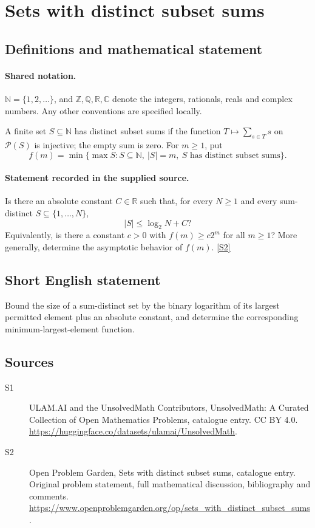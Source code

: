 \documentclass[11pt]{article}
\newcommand{\sref}[2]{\hyperlink{source:#1:#2}{[S#2]}}
\begin{document}
\section{Sets with distinct subset sums}\label{statement}

\subsection{Definitions and mathematical statement}

\paragraph{Shared notation.}$\mathbb N=\{1,2,\ldots\}$, and $\mathbb Z,\mathbb Q,\mathbb R,\mathbb C$ denote the integers, rationals, reals and complex numbers. Any other conventions are specified locally.


A finite set $S\subseteq\mathbb N$ has distinct subset sums if the function $T\mapsto\sum_{s\in T}s$ on $\mathcal P(S)$ is injective; the empty sum is zero. For $m\ge1$, put
\[
 f(m)=\min\{\max S:S\subseteq\mathbb N,\ |S|=m,\ S\text{ has distinct subset sums}\}.
\]
\paragraph{Statement recorded in the supplied source.}
Is there an absolute constant $C\in\mathbb R$ such that, for every $N\ge1$ and every sum-distinct $S\subseteq\{1,\ldots,N\}$,
\[
 |S|\le\log_2 N+C?
\]
Equivalently, is there a constant $c>0$ with $f(m)\ge c2^m$ for all $m\ge1$? More generally, determine the asymptotic behavior of $f(m)$. \sref{statement}{2}
\subsection{Short English statement}
Bound the size of a sum-distinct set by the binary logarithm of its largest permitted element plus an absolute constant, and determine the corresponding minimum-largest-element function.
\subsection{Sources}
\begin{description}
\item[\hypertarget{source:statement:1}{S1}] ULAM.AI and the UnsolvedMath Contributors, UnsolvedMath: A Curated Collection of Open Mathematics Problems, catalogue entry. CC BY 4.0. \url{https://huggingface.co/datasets/ulamai/UnsolvedMath}.
\item[\hypertarget{source:statement:2}{S2}] Open Problem Garden, Sets with distinct subset sums, catalogue entry. Original problem statement, full mathematical discussion, bibliography and comments. \url{https://www.openproblemgarden.org/op/sets_with_distinct_subset_sums}.
\end{description}
\label{end:statement}
\end{document}

